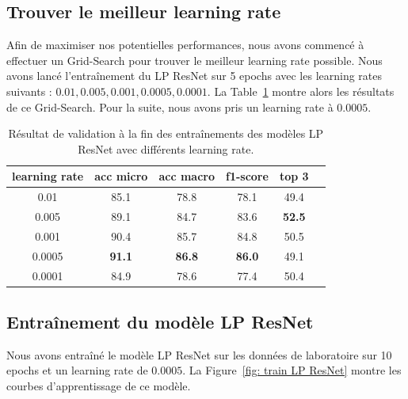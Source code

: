 
\subsection{Trouver le meilleur learning rate}
Afin de maximiser nos potentielles performances, nous avons commencé à effectuer un Grid-Search pour trouver le meilleur learning rate possible. Nous avons lancé l'entraînement du LP ResNet sur 5 epochs avec les learning rates suivants : $0.01, 0.005, 0.001, 0.0005, 0.0001$. La Table~\ref{tab:gridsearch} montre alors les résultats de ce Grid-Search. Pour la suite, nous avons pris un learning rate à $0.0005$.

\begin{table}[ht]
    \centering
    \begin{tabular}{cccccc}
    \toprule
    learning rate & acc micro & acc macro & f1-score & top 3 \\
    \midrule
    0.01 & 85.1 & 78.8 & 78.1 & 49.4 \\
    0.005 & 89.1 & 84.7 & 83.6 & \textbf{52.5} \\
    0.001 & 90.4 & 85.7 & 84.8 & 50.5 \\
    0.0005 & \textbf{91.1} & \textbf{86.8} & \textbf{86.0} & 49.1 \\
    0.0001 & 84.9 & 78.6 & 77.4 & 50.4 \\
    \bottomrule
    \end{tabular}
    \caption{Résultat de validation à la fin des entraînements des modèles LP ResNet avec différents learning rate.}
    \label{tab:gridsearch}
\end{table}

\subsection{Entraînement du modèle LP ResNet}
Nous avons entraîné le modèle LP ResNet sur les données de laboratoire sur 10 epochs et un learning rate de $0.0005$. La Figure~\ref{fig: train LP ResNet} montre les courbes d'apprentissage de ce modèle.

